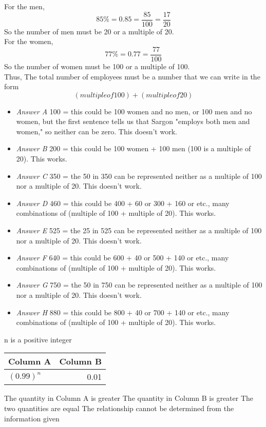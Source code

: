 \documentclass[answers, 11pt]{exam}
\begin{document}
\begin{questions}
\begin{solution}
For the men,
\begin{equation*}
85\% = 0.85 = \frac{85}{100} = \frac{17}{20}
\end{equation*}
So the number of men must be 20 or a multiple of 20.\\ 
For the women,
\begin{equation*}
77\% = 0.77 = \frac{77}{100}
\end{equation*}
So the number of women must be 100 or a multiple of 100.\\ 
Thus, The total number of employees must be a number that we can write in the form
\begin{equation*}
(multiple of 100) + (multiple of 20) 
\end{equation*} 
\begin{itemize}
\item\textit{Answer A} 100 = this could be 100 women and no men, or 100 men and no women, but the first sentence tells us that Sargon "employs both men and women," so neither can be zero.
This doesn't work. 
\item\textit{Answer B} 200 = this could be 100 women + 100 men (100 is a multiple of 20). This works.
\item\textit{Answer C} 350 = the 50 in 350 can be represented neither as a multiple of 100 nor a multiple of 20. This doesn't work. 
\item\textit{Answer D} 460 = this could be 400 + 60 or 300 + 160 or etc., many combinations of (multiple of 100 + multiple of 20). This works. 
\item\textit{Answer E} 525 = the 25 in 525 can be represented neither as a multiple of 100 nor a multiple of 20. This doesn't work. 
\item\textit{Answer F} 640 = this could be 600 + 40 or 500 + 140 or etc., many combinations of (multiple of 100 + multiple of 20). This works.
\item\textit{Answer G} 750 = the 50 in 750 can be represented neither as a multiple of 100 nor a multiple of 20. This doesn't work.
\item\textit{Answer H} 880 = this could be 800 + 40 or 700 + 140 or etc., many combinations of (multiple of 100 + multiple of 20). This works. 
\end{itemize}
\end{solution}

\question
n is a positive integer
\begin{center}
\begin{tabular} { l  r}
\hline
Column A & Column B \\
\hline
$(0.99)^n$ & 0.01 \\ \hline
\end{tabular}
\end{center}
\begin{choices}
\choice The quantity in Column A is greater
\choice The quantity in Column B is greater
\choice The two quantities are equal
\CorrectChoice The relationship cannot be determined from the information given
\end{choices}


\end{questions}
\end{document}
